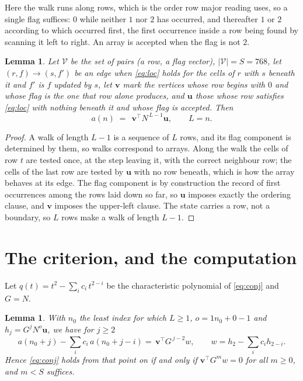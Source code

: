 \documentclass[11pt,a4paper]{article}
\theoremstyle{plain}
\newtheorem{lemma}[theorem]{Lemma}
\theoremstyle{definition}
\begin{document}
Here the walk runs along rows, which is the order row
major reading uses, so a single flag suffices: $0$ while neither $1$ nor $2$ has
occurred, and thereafter $1$ or $2$ according to which occurred first, the first occurrence
inside a row being found by scanning it left to right. An array is accepted when the flag
is not $2$.

\begin{lemma}\label{lem:walk}
Let $\mathcal V$ be the set of pairs (a row, a flag vector), $|\mathcal V|=S=768$, let
$(r,f)\to(s,f')$ be an edge when \eqref{eq:loc} holds for the cells of $r$ with $s$ beneath
it and $f'$ is $f$ updated by $s$, let $\mathbf{v}$ mark the vertices whose row begins
with $0$ and whose flag is the one that row alone produces, and $\mathbf{u}$ those whose
row satisfies \eqref{eq:loc} with nothing beneath it and whose flag is accepted. Then
\[
a(n)\;=\;\,\mathbf{v}^{\!\top}N^{\,L-1}\mathbf{u},\qquad L=n.
\]
\end{lemma}

\begin{proof}
A walk of length $L-1$ is a sequence of $L$ rows, and its flag component is determined by
them, so walks correspond to arrays. Along the walk the cells of row $t$ are tested once,
at the step leaving it, with the correct neighbour row; the cells of the last row are
tested by $\mathbf{u}$ with no row beneath, which is how the array behaves at its edge.
The flag component is by construction the record of first occurrences among the rows laid
down so far, so $\mathbf{u}$ imposes exactly the ordering clause, and $\mathbf{v}$ imposes
the upper-left clause. The state carries a row, not a boundary, so $L$ rows make a walk
of length $L-1$.
\end{proof}

\section{The criterion, and the computation}

Let $q(t)=t^{2}-\sum_i c_i\,t^{2-i}$ be the characteristic polynomial of
\eqref{eq:conj} and $G=N$.

\begin{lemma}\label{lem:crit}
With $n_0$ the least index for which $L\ge1$, $o=1n_0+0-1$ and
$h_j=G^{j}N^{o}\mathbf{u}$, we have for $j\ge2$
\[
a(n_0+j)-\sum_i c_i\,a(n_0+j-i)=\,\mathbf{v}^{\!\top}G^{\,j-2}w,
\qquad w=h_{2}-\sum_i c_ih_{2-i} .
\]
Hence \eqref{eq:conj} holds from that point on if and only if
$\mathbf{v}^{\!\top}G^{m}w=0$ for all $m\ge0$, and $m<S$ suffices.
\end{lemma}
\end{document}
